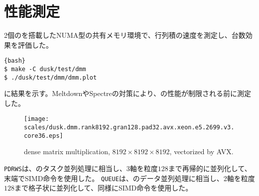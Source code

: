 \documentclass[10pt,a4paper]{book}
\begin{document}
\section{性能測定}

2個の\CPU{}を搭載したNUMA型の共有メモリ環境で、行列積の速度を測定し、台数効果を評価した。

\begin{Verbatim}{bash}
$ make -C dusk/test/dmm
$ ./dusk/test/dmm/dmm.plot
\end{Verbatim}

に結果を示す。MeltdownやSpectreの対策により、\CPU{}の性能が制限される前に測定した。

\begin{figure}[h]
\centering
\texttt{[image: scales/dusk.dmm.rank8192.gran128.pad32.avx.xeon.e5.2699.v3.core36.eps]}
\caption{dense matrix multiplication, $8192\times8192\times8192$, vectorized by AVX.\label{fig:dusk.dmm}}
\end{figure}

\texttt{PDRWS}は、のタスク並列処理に相当し、3軸を粒度$128$まで再帰的に並列化して、末端でSIMD命令を使用した。
\texttt{QUEUE}は、のデータ並列処理に相当し、2軸を粒度$128$まで格子状に並列化して、同様にSIMD命令を使用した。
\end{document}
